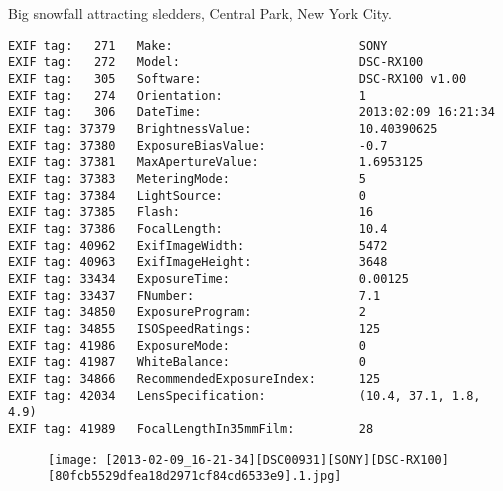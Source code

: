 \section{\protect{}}
\noindent Big snowfall attracting sledders, Central Park, New York City.
\noindent
\begin{lstlisting}
EXIF tag:   271   Make:                          SONY
EXIF tag:   272   Model:                         DSC-RX100
EXIF tag:   305   Software:                      DSC-RX100 v1.00
EXIF tag:   274   Orientation:                   1
EXIF tag:   306   DateTime:                      2013:02:09 16:21:34
EXIF tag: 37379   BrightnessValue:               10.40390625
EXIF tag: 37380   ExposureBiasValue:             -0.7
EXIF tag: 37381   MaxApertureValue:              1.6953125
EXIF tag: 37383   MeteringMode:                  5
EXIF tag: 37384   LightSource:                   0
EXIF tag: 37385   Flash:                         16
EXIF tag: 37386   FocalLength:                   10.4
EXIF tag: 40962   ExifImageWidth:                5472
EXIF tag: 40963   ExifImageHeight:               3648
EXIF tag: 33434   ExposureTime:                  0.00125
EXIF tag: 33437   FNumber:                       7.1
EXIF tag: 34850   ExposureProgram:               2
EXIF tag: 34855   ISOSpeedRatings:               125
EXIF tag: 41986   ExposureMode:                  0
EXIF tag: 41987   WhiteBalance:                  0
EXIF tag: 34866   RecommendedExposureIndex:      125
EXIF tag: 42034   LensSpecification:             (10.4, 37.1, 1.8, 4.9)
EXIF tag: 41989   FocalLengthIn35mmFilm:         28

\end{lstlisting}
\clearpage
\begin{figure}
\raggedleft
\texttt{[image: [2013-02-09\_16-21-34][DSC00931][SONY][DSC-RX100][80fcb5529dfea18d2971cf84cd6533e9].1.jpg]}
\end{figure}


\clearpage
